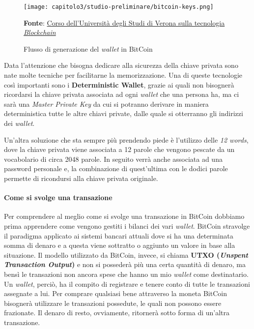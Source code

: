 \begin{figure}[tbh!]
  \centering
  \texttt{[image: capitolo3/studio-preliminare/bitcoin-keys.png]}
  \caption{Flusso di generazione del \textit{wallet} in BitCoin}
  \textbf{Fonte}: \href{https://github.com/spoto/blockchain-course}{Corso dell'Università degli Studi di Verona sulla tecnologia \textit{Blockchain}} 
\end{figure}

Data l'attenzione che bisogna dedicare alla sicurezza della chiave privata sono nate molte tecniche per facilitarne la memorizzazione. Una di queste tecnologie così importanti sono i \textbf{Deterministic Wallet}, grazie ai quali non bisognerà ricordarsi la chiave privata associata ad ogni \textit{wallet} che una persona ha, ma ci sarà una \textit{Master Private Key} da cui si potranno derivare in maniera deterministica tutte le altre chiavi private, dalle quale si otterranno gli indirizzi dei \textit{wallet}. 

Un'altra soluzione che sta sempre più prendendo piede è l'utilizzo delle \textit{12 words}, dove la chiave privata viene associata a 12 parole che vengono pescate da un vocabolario di circa 2048 parole. In seguito verrà anche associata ad una password personale e, la combinazione di quest'ultima con le dodici parole permette di ricondursi alla chiave privata originale. 

\paragraph{Come si svolge una transazione}
Per comprendere al meglio come si svolge una transazione in BitCoin dobbiamo prima apprendere come vengono gestiti i bilanci dei vari \textit{wallet}. BitCoin stravolge il paradigma applicato ai sistemi bancari attuali dove si ha una determinata somma di denaro e a questa viene sottratto o aggiunto un valore in base alla situazione. Il modello utilizzato da BitCoin, invece, si chiama \textbf{UTXO (\textit{Unspent Transaction Output})} e non si possederà più una certa quantità di denaro, ma bensì le transazioni non ancora spese che hanno un mio \textit{wallet} come destinatario. Un \textit{wallet}, perciò, ha il compito di registrare e tenere conto di tutte le transazioni assegnate a lui. Per comprare qualsiasi bene attraverso la moneta BitCoin bisognerà utilizzare le transazioni possedute, le quali non possono essere frazionate. Il denaro di resto, ovviamente, ritornerà sotto forma di un'altra transazione.

